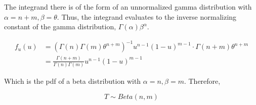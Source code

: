The integrand there is of the form of an unnormalized gamma distribution with $\alpha = n+m, \beta = \theta$. Thus, the integrand evaluates to the inverse normalizing constant of the gamma distribution, $\Gamma(\alpha)\beta^{\alpha}$.

\begin{align*}
	f_u(u) &= (\Gamma(n)\Gamma(m)\theta^{n+m})^{-1} u^{n-1}  (1-u)^{m-1} \cdot \Gamma(n+m)\theta^{n+m} \\
	&= \frac{\Gamma(n+m)}{\Gamma(n)\Gamma(m)} u^{n-1} (1-u)^{m-1}
\end{align*}

Which is the pdf of a beta distribution with $\alpha = n, \beta = m$. Therefore,

\[
	T \sim Beta(n,m)
\]

